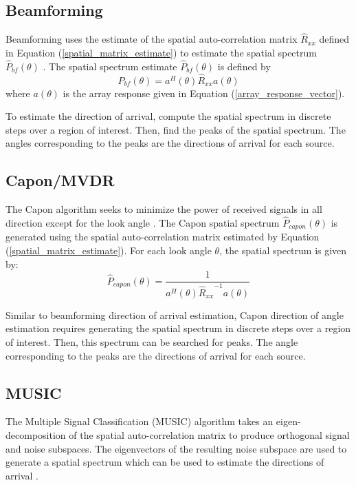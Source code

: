 \documentclass[conference]{IEEEtran}
\begin{document}
	\subsection{Beamforming}
	
		Beamforming uses the estimate of the spatial auto-correlation matrix $\hat{R}_{xx}$ defined in Equation (\ref{spatial_matrix_estimate}) to estimate the spatial spectrum $\hat{P}_{bf}(\theta)$ \cite{doa_algorithms_raghu}. The spatial spectrum estimate $\hat{P}_{bf}(\theta)$ is defined by
		\begin{equation}
			\hat{P}_{bf}(\theta) = a^H(\theta)\hat{R}_{xx}a(\theta)
		\end{equation}
		where $a(\theta)$ is the array response given in Equation (\ref{array_response_vector}).
		
		To estimate the direction of arrival, compute the spatial spectrum in discrete steps over a region of interest. Then, find the peaks of the spatial spectrum. The angles corresponding to the peaks are the directions of arrival for each source.
		
	\subsection{Capon/MVDR}
	
		The Capon algorithm seeks to minimize the power of received signals in all direction except for the look angle \cite{doa_algorithms_raghu}. The Capon spatial spectrum $\hat{P}_{capon}(\theta)$ is generated using  the spatial auto-correlation matrix estimated by Equation (\ref{spatial_matrix_estimate}). For each look angle $\theta$, the spatial spectrum is given by:
	\begin{equation}
		\hat{P}_{capon}(\theta) = \frac{1}{a^H(\theta){\hat{R}_{xx}}^{-1}a(\theta)}
	\end{equation}
	
		Similar to beamforming direction of arrival estimation, Capon direction of angle estimation requires generating the spatial spectrum in discrete steps over a region of interest. Then, this spectrum can be searched for peaks. The angle corresponding to the peaks are the directions of arrival for each source.
	
	\subsection{MUSIC}
	
		The Multiple Signal Classification (MUSIC) algorithm takes an eigen-decomposition of the spatial auto-correlation matrix to produce orthogonal signal and noise subspaces. The eigenvectors of the resulting noise subspace are used to generate a spatial spectrum which can be used to estimate the directions of arrival \cite{doa_algorithms_raghu}.
	
\end{document}
